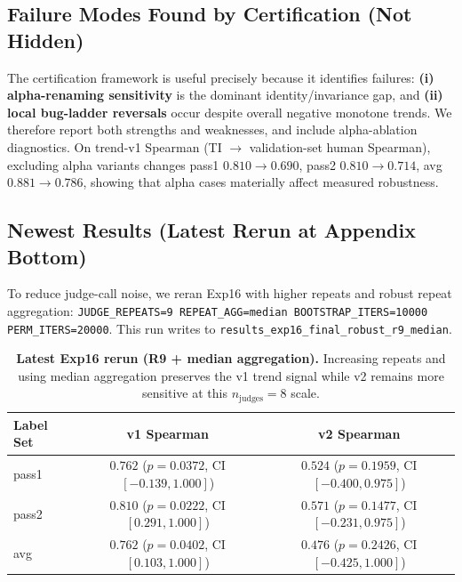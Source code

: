 \documentclass{article}
\begin{document}
\subsection{Failure Modes Found by Certification (Not Hidden)}
The certification framework is useful precisely because it identifies failures:
\textbf{(i) alpha-renaming sensitivity} is the dominant identity/invariance gap,
and \textbf{(ii) local bug-ladder reversals} occur despite overall negative monotone trends.
We therefore report both strengths and weaknesses, and include alpha-ablation diagnostics.
On trend-v1 Spearman (TI \(\rightarrow\) validation-set human Spearman), excluding alpha variants changes
pass1 \(0.810\rightarrow0.690\), pass2 \(0.810\rightarrow0.714\), avg \(0.881\rightarrow0.786\),
showing that alpha cases materially affect measured robustness.

\subsection{Newest Results (Latest Rerun at Appendix Bottom)}
To reduce judge-call noise, we reran Exp16 with higher repeats and robust repeat aggregation:
\texttt{JUDGE\_REPEATS=9 REPEAT\_AGG=median BOOTSTRAP\_ITERS=10000 PERM\_ITERS=20000}.
This run writes to \texttt{results\_exp16\_final\_robust\_r9\_median}.

\begin{table}[t]
  \centering
  \small
  \begin{tabular}{lcc}
    \toprule
    \textbf{Label Set} & \textbf{v1 Spearman}                             & \textbf{v2 Spearman}                             \\
    \midrule
    pass1              & \(0.762\) (\(p=0.0372\), CI \([-0.139, 1.000]\)) & \(0.524\) (\(p=0.1959\), CI \([-0.400, 0.975]\)) \\
    pass2              & \(0.810\) (\(p=0.0222\), CI \([0.291, 1.000]\))  & \(0.571\) (\(p=0.1477\), CI \([-0.231, 0.975]\)) \\
    avg                & \(0.762\) (\(p=0.0402\), CI \([0.103, 1.000]\))  & \(0.476\) (\(p=0.2426\), CI \([-0.425, 1.000]\)) \\
    \bottomrule
  \end{tabular}
  \caption{\textbf{Latest Exp16 rerun (R9 + median aggregation).}
    Increasing repeats and using median aggregation preserves the v1 trend signal while v2 remains more sensitive at this \(n_\text{judges}=8\) scale.}
  \label{tab:app-latest-r9-median}
\end{table}
\end{document}
